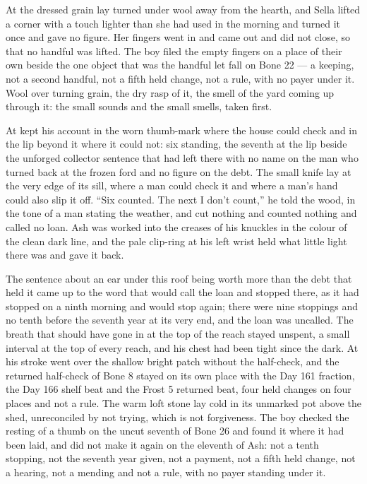 At  the dressed grain lay turned under wool away from the hearth, and Sella lifted a corner with a touch lighter than she had used in the morning and turned it once and gave no figure. Her fingers went in and came out and did not close, so that no handful was lifted. The boy filed the empty fingers on a place of their own beside the one object that was the handful let fall on Bone 22 --- a keeping, not a second handful, not a fifth held change, not a rule, with no payer under it. Wool over turning grain, the dry rasp of it, the smell of the yard coming up through it: the small sounds and the small smells, taken first.

At   kept his account in the worn thumb-mark where the house could check and in the lip beyond it where it could not: six standing, the seventh at the lip beside the unforged collector sentence that  had left there with no name on the man who turned back at the frozen ford and no figure on the debt. The small knife lay at the very edge of its sill, where a man could check it and where a man's hand could also slip it off. “Six counted. The next I don't count,” he told the wood, in the tone of a man stating the weather, and cut nothing and counted nothing and called no loan. Ash was worked into the creases of his knuckles in the colour of the clean dark line, and the pale clip-ring at his left wrist held what little light there was and gave it back.

The sentence about an ear under this roof being worth more than the debt that held it came up to the word that would call the loan and stopped there, as it had stopped on a ninth morning and would stop again; there were nine stoppings and no tenth before the seventh year at its very end, and the loan was uncalled. The breath that should have gone in at the top of the reach stayed unspent, a small interval at the top of every reach, and his chest had been tight since the dark. At  his stroke went over the shallow bright patch without the half-check, and the returned half-check of Bone 8 stayed on its own place with the Day 161 fraction, the Day 166 shelf beat and the Frost 5 returned beat, four held changes on four places and not a rule. The warm loft stone lay cold in its unmarked pot above the shed, unreconciled by not trying, which is not forgiveness. The boy checked the resting of a thumb on the uncut seventh of Bone 26 and found it where it had been laid, and did not make it again on the eleventh of Ash: not a tenth stopping, not the seventh year given, not a payment, not a fifth held change, not a hearing, not a mending and not a rule, with no payer standing under it.

